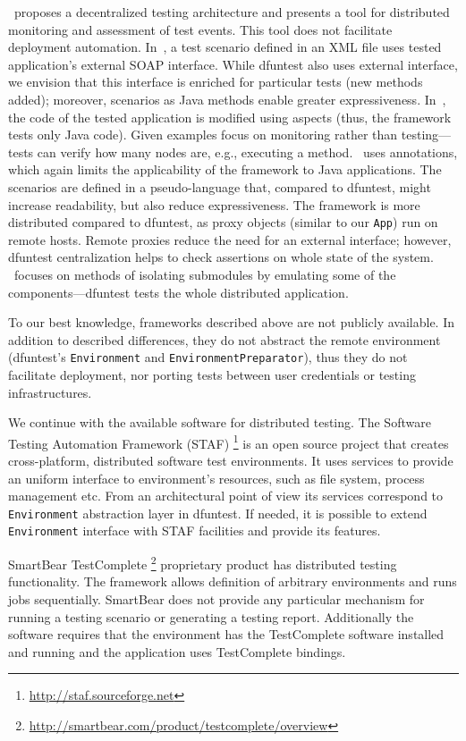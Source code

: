 \cite{ulr99}~proposes a decentralized testing architecture and presents a tool for distributed monitoring and assessment of test events. This tool does not facilitate deployment automation.
In~\cite{tsa03}, a test scenario defined in an XML file uses tested application's external SOAP interface. 
While dfuntest also uses external interface, we envision that this interface is enriched for particular tests (new methods  added); moreover, scenarios as Java methods enable greater expressiveness.
In~\cite{hug04}, the code of the tested application is modified using aspects (thus, the framework tests only Java code). 
Given examples focus on monitoring rather than testing---tests can verify how many nodes are, e.g., executing a method.
\cite{de10}~uses annotations, which again limits the applicability of the framework to Java applications. 
The scenarios are defined in a pseudo-language that, compared to dfuntest, might increase readability, but also reduce expressiveness.
The framework is more distributed compared to dfuntest, as proxy objects (similar to our \texttt{App}) run on remote hosts. 
Remote proxies reduce the need for an external interface; 
however, dfuntest centralization helps to check assertions on whole state of the system.
\cite{tor10}~focuses on methods of isolating submodules by emulating some of the components---dfuntest tests the whole distributed application. 

To our best knowledge, frameworks described above are not publicly available. In addition to described differences, they do not abstract the remote environment (dfuntest's \texttt{Environment} and \texttt{EnvironmentPreparator}), thus they do not facilitate deployment, nor porting tests between user credentials or testing infrastructures.

We continue with the available software for distributed testing.
The Software Testing Automation Framework (STAF) \footnote{\url{http://staf.sourceforge.net}} is an open source
project that creates cross-platform, distributed software test environments. It
uses services to provide an uniform interface to environment's resources, such
as file system, process management etc. From an architectural point of view its
services correspond to \texttt{Environment} abstraction layer in dfuntest.
If needed, it is possible to extend \texttt{Environment} interface with STAF facilities and provide its features.

SmartBear TestComplete \footnote{\url{http://smartbear.com/product/testcomplete/overview}} proprietary product has distributed testing functionality.
The framework allows definition of arbitrary environments and runs jobs sequentially.
SmartBear does not provide any particular mechanism for running a testing scenario or generating a testing report.
Additionally the software requires that the environment has the TestComplete software installed and running and the application uses TestComplete bindings.

